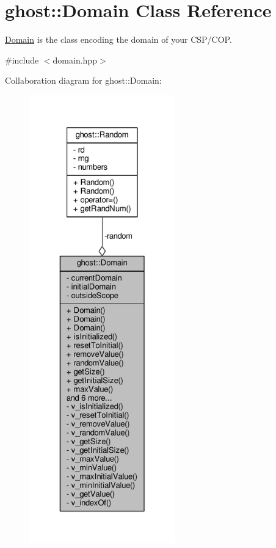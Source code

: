 \hypertarget{classghost_1_1Domain}{\section{ghost\-:\-:Domain Class Reference}
\label{classghost_1_1Domain}
}


\hyperlink{classghost_1_1Domain}{Domain} is the class encoding the domain of your C\-S\-P/\-C\-O\-P.  




{\ttfamily \#include $<$domain.\-hpp$>$}



Collaboration diagram for ghost\-:\-:Domain\-:
\nopagebreak
\begin{figure}[H]
\begin{center}
\leavevmode
\includegraphics[height=550pt]{classghost_1_1Domain__coll__graph}
\end{center}
\end{figure}
